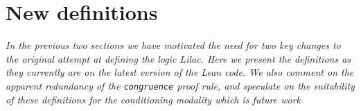 \section{New definitions}

\emph{In the previous two sections we have motivated the need for two key changes to the original attempt at defining the logic Lilac. Here we present the definitions as
they currently are on the latest version of the Lean code. We also comment on the apparent redundancy of the \texttt{congruence} proof rule, and speculate on the suitability
of these definitions for the conditioning modality which is future work}
